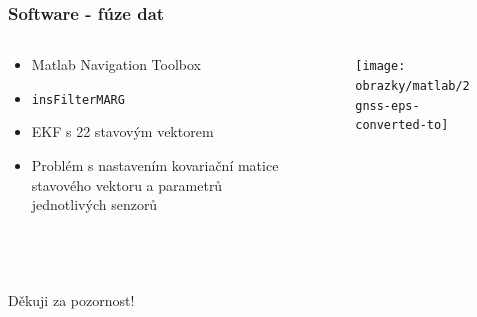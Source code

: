\documentclass[%
  12pt,       				%
	t,                  %
	aspectratio=1610,   %
	unicode,						%
]{beamer}				    	%
\begin{document}
\begin{frame} 
	\frametitle{Software - fúze dat}
	
	\begin{columns}[T] 								%
		\begin{column}{0.5\textwidth}		%
			
			\begin{itemize}
				\item Matlab Navigation Toolbox
				\item  \texttt{insFilterMARG}
				\item EKF s 22 stavovým vektorem
				\item Problém s nastavením kovariační matice stavového vektoru a parametrů jednotlivých senzorů
				
				
			\end{itemize}
		\end{column}
		\begin{column}{0.5\textwidth}		%
			\begin{figure}%
				\centering
			    \texttt{[image: obrazky/matlab/2gnss-eps-converted-to]}
			\end{figure}


		\end{column}
		

	\end{columns}											%
\end{frame}


\begin{frame}[c] 
	\frametitle{\mbox{ }}
	\begin{center}
		{\Huge Děkuji za pozornost!}
	\end{center}
\end{frame}
\end{document}
